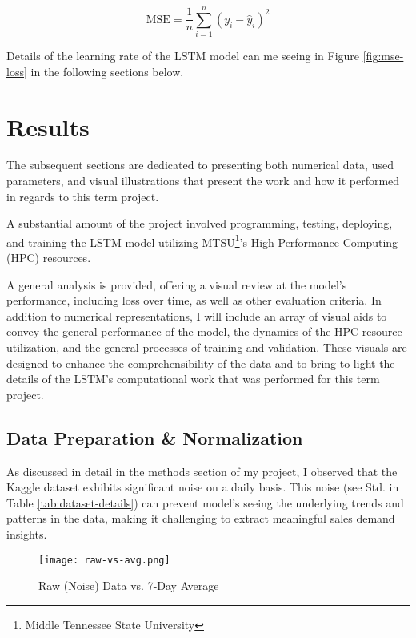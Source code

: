 \documentclass[10pt, journal, letterpaper, compsoc]{IEEEtran}
\begin{document}
\begin{equation}
\text{MSE} = \frac{1}{n} \sum_{i=1}^{n} (y_i - \hat{y}_i)^2
\label{eq:mse}
\end{equation}

Details of the learning rate of the LSTM model can me seeing in Figure \ref{fig:mse-loss} in the following sections below.


\section{Results}
The subsequent sections are dedicated to presenting both numerical data, used parameters, and visual illustrations that present the work and how it performed in regards to this term project.

A substantial amount of the project involved programming, testing, deploying, and training the LSTM model utilizing MTSU\footnote{Middle Tennessee State University}'s High-Performance Computing (HPC) resources.

A general analysis is provided, offering a visual review at the model's performance, including loss over time, as well as other evaluation criteria. In addition to numerical representations, I will include an array of visual aids to convey the general performance of the model, the dynamics of the HPC resource utilization, and the general processes of training and validation. These visuals are designed to enhance the comprehensibility of the data and to bring to light the details of the LSTM's computational work that was performed for this term project.


\subsection{Data Preparation \& Normalization}
As discussed in detail in the methods section of my project, I observed that the Kaggle dataset\cite{demand-forecasting-kernels-only} exhibits significant noise on a daily basis. This noise (see Std. in Table \ref{tab:dataset-details}) can prevent model's seeing the underlying trends and patterns in the data, making it challenging to extract meaningful sales demand insights.

\begin{figure}[h]
\centering
\captionsetup{justification=centering,margin=1cm}
\texttt{[image: raw-vs-avg.png]}
\caption{Raw (Noise) Data vs. 7-Day Average}
\label{fig:raw-vs-avg}
\end{figure}
\end{document}

